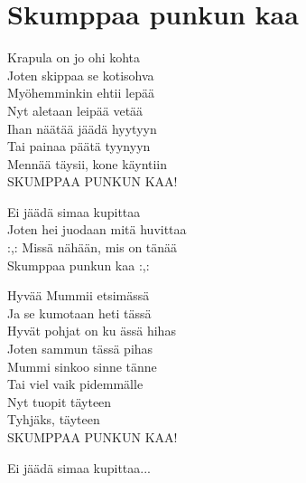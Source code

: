 \section{Skumppaa punkun kaa}

Krapula on jo ohi kohta\\
Joten skippaa se kotisohva\\
Myöhemminkin ehtii lepää\\
Nyt aletaan leipää vetää\\
Ihan näätää jäädä hyytyyn\\
Tai painaa päätä tyynyyn\\
Mennää täysii, kone käyntiin\\
SKUMPPAA PUNKUN KAA!

Ei jäädä simaa kupittaa\\
Joten hei juodaan mitä huvittaa\\
:,: Missä nähään, mis on tänää\\
Skumppaa punkun kaa :,:

Hyvää Mummii etsimässä\\
Ja se kumotaan heti tässä\\
Hyvät pohjat on ku ässä hihas\\
Joten sammun tässä pihas\\
Mummi sinkoo sinne tänne\\
Tai viel vaik pidemmälle\\
Nyt tuopit täyteen\\
Tyhjäks, täyteen\\
SKUMPPAA PUNKUN KAA!

Ei jäädä simaa kupittaa...